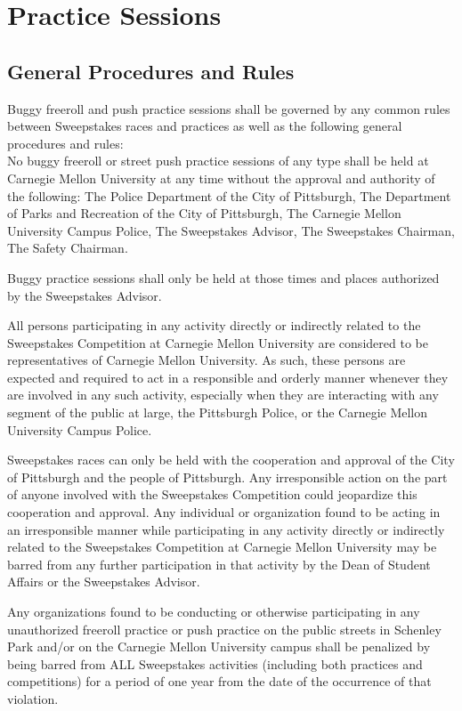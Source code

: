 \chapter{Practice Sessions}

\section{General Procedures and Rules}

	Buggy freeroll and push practice sessions shall be governed by any common rules between Sweepstakes races and practices as well as the following general procedures and rules: \\ 

	No buggy freeroll or street push practice sessions of any type shall be held at Carnegie Mellon University at any time without the approval and authority of the following: The Police Department of the City of Pittsburgh, The Department of Parks and Recreation of the City of Pittsburgh, The Carnegie Mellon University Campus Police, The Sweepstakes Advisor, The Sweepstakes Chairman, The Safety Chairman.

	Buggy practice sessions shall only be held at those times and places authorized by the Sweepstakes Advisor.

	All persons participating in any activity directly or indirectly related to the Sweepstakes Competition at Carnegie Mellon University are considered to be representatives of Carnegie Mellon University. As such, these persons are expected and required to act in a responsible and orderly manner whenever they are involved in any such activity, especially when they are interacting with any segment of the public at large, the Pittsburgh Police, or the Carnegie Mellon University Campus Police.

	Sweepstakes races can only be held with the cooperation and approval of the City of Pittsburgh and the people of Pittsburgh. Any irresponsible action on the part of anyone involved with the Sweepstakes Competition could jeopardize this cooperation and approval. Any individual or organization found to be acting in an irresponsible manner while participating in any activity directly or indirectly related to the Sweepstakes Competition at Carnegie Mellon University may be barred from any further participation in that activity by the Dean of Student Affairs or the Sweepstakes Advisor.

	Any organizations found to be conducting or otherwise participating in any unauthorized freeroll practice or push practice on the public streets in Schenley Park and/or on the Carnegie Mellon University campus shall be penalized by being barred from ALL Sweepstakes activities (including both practices and competitions) for a period of one year from the date of the occurrence of that violation.

